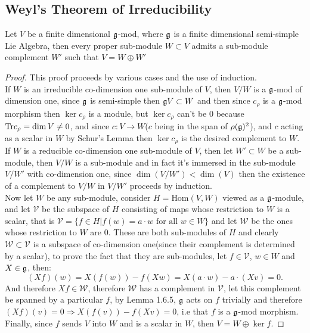 \subsection*{Weyl's Theorem of Irreducibility}
\begin{teo}
	Let $V$ be a finite dimensional $\mathfrak{g}$-mod, where $\mathfrak{g}$ is a finite dimensional semi-simple Lie Algebra, then every proper sub-module $W\subset V$ admits a sub-module complement $W'$ such that $V=W\oplus W'$
	\label{Weyl's Theorem}
\end{teo}
\begin{proof}
	This proof proceeds by various cases and the use of induction.\\
	If $W$ is an irreducible co-dimension one sub-module of $V$, then $V/W$ is a $\mathfrak{g}$-mod of dimension one, since $\mathfrak{g}$ is semi-simple then $\mathfrak{g} V \subset W$ and then since $c_\rho$ is a $\mathfrak{g}$-mod morphism then $\ker c_\rho$ is a module, but $\ker c_\rho$ can't be $0$ because $\text{Tr} c_\rho = \dim V \not=0$, and since $c:V\rightarrow W$($c$ being in the span of $\rho(\mathfrak{g})^2$), and $c$ acting as a scalar in $W$ by Schur's Lemma then $\ker c_\rho$ is the desired complement to $W$.\\
	If $W$ is a reducible co-dimension one sub-module of $V$, then let $W'\subset W$ be a sub-module, then $V/W$ is a sub-module and in fact it's immersed in the sub-module $V/W'$ with co-dimension one, since $\dim(V/W')<\dim(V)$ then the existence of a complement to $V/W$ in $V/W'$ proceeds by induction.\\
	Now let $W$ be any sub-module, consider $H=\text{Hom}(V,W)$ viewed as a $\mathfrak{g}$-module, and let $\mathcal{V}$ be the subspace of $H$ consisting of maps whose restriction to $W$ is a scalar, that is $\mathcal{V}=\{f \in H | f(w)=a\cdot w \text{ for all } w \in W\}$ and let $\mathcal{W}$ be the ones whose restriction to $W$ are $0$. These are both sub-modules of $H$ and clearly $\mathcal{W} \subset \mathcal{V}$ is a subspace of co-dimension one(since their complement is determined by a scalar), to prove the fact that they are sub-modules, let $f \in \mathcal{V}$, $w \in W$ and $X \in \mathfrak{g}$, then:
	$$(Xf)(w) = X(f(w)) - f(Xw) = X(a\cdot w)-a\cdot (Xv) = 0.$$
	And therefore $Xf \in \mathcal{W}$, therefore $\mathcal{W}$ has a complement in $\mathcal{V}$, let this complement be spanned by a particular $f$, by Lemma 1.6.5, $\mathfrak{g}$ acts on $f$ trivially and therefore $(Xf)(v) = 0 \Rightarrow X(f(v)) - f(Xv)=0$, i.e that $f$ is a $\mathfrak{g}$-mod morphism. Finally, since $f$ sends $V$ into $W$ and is a scalar in $W$, then $V=W \oplus \ker f$. 
\end{proof} 